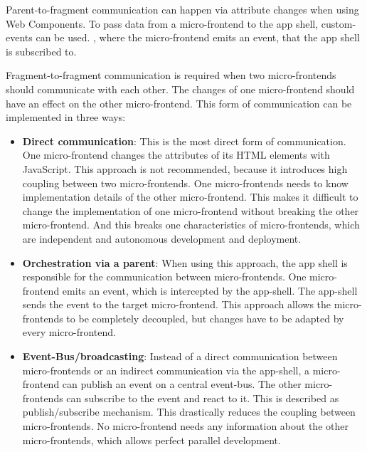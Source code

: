 \bigskip

\noindent Parent-to-fragment communication can happen via attribute changes when using Web Components. \cite[58-59]{book:2019:farrell:background:micro-frontends:web-components-in-action} To pass data from a micro-frontend to the app shell, custom-events can be used. \cite[315]{book:2019:farrell:background:micro-frontends:web-components-in-action}, where the micro-frontend emits an event, that the app shell is subscribed to. \cite{book:2020:geers:background:micro-frontends:micro-frontends-in-action}

\bigskip

\noindent Fragment-to-fragment communication is required when two micro-frontends should communicate with each other. The changes of one micro-frontend should have an effect on the other micro-frontend. This form of communication can be implemented in three ways: \cite[107-108]{book:2020:geers:background:micro-frontends:micro-frontends-in-action}

\begin{itemize}
    \item \textbf{Direct communication}: This is the most direct form of communication. One micro-frontend changes the attributes of its HTML elements with JavaScript. This approach is not recommended, because it introduces high coupling between two micro-frontends. One micro-frontends needs to know implementation details of the other micro-frontend. This makes it difficult to change the implementation of one micro-frontend without breaking the other micro-frontend. And this breaks one characteristics of micro-frontends, which are independent and autonomous development and deployment.
    \item \textbf{Orchestration via a parent}: When using this approach, the app shell is responsible for the communication between micro-frontends. One micro-frontend emits an event, which is intercepted by the app-shell. The app-shell sends the event to the target micro-frontend. This approach allows the micro-frontends to be completely decoupled, but changes have to be adapted by every micro-frontend.
    \item \textbf{Event-Bus/broadcasting}: Instead of a direct communication between micro-frontends or an indirect communication via the app-shell, a micro-frontend can publish an event on a central event-bus. The other micro-frontends can subscribe to the event and react to it. This is described as publish/subscribe mechanism. This drastically reduces the coupling between micro-frontends. No micro-frontend needs any information about the other micro-frontends, which allows perfect parallel development.
\end{itemize}

